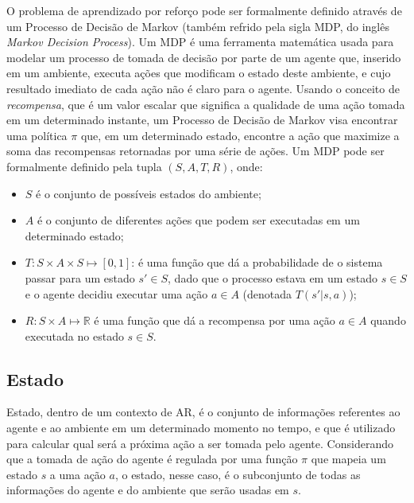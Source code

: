 \documentclass[cic,tc]{iiufrgs}
\begin{document}
O problema de aprendizado por reforço pode ser formalmente definido através
de um Processo de Decisão de Markov (também refrido pela sigla MDP, do inglês
\textit{Markov Decision Process}). Um MDP é uma ferramenta matemática usada
para modelar um processo de tomada de decisão por parte de um agente que,
inserido em um ambiente, executa ações que modificam o estado deste ambiente,
e cujo resultado imediato de cada ação não é claro para o agente. Usando o
conceito de \textit{recompensa}, que é um valor escalar que significa a
qualidade de uma ação tomada em um determinado instante, um Processo de Decisão
de Markov visa encontrar uma política $\pi$ que, em um determinado estado,
encontre a ação que maximize a soma das recompensas retornadas por uma série de
ações.
Um MDP pode ser formalmente definido pela tupla $ (S, A, T, R)$, onde:

\begin{itemize}
  \item $S$ é o conjunto de possíveis estados do ambiente;
  \item $A$ é o conjunto de diferentes ações que podem ser executadas em um
  determinado estado;
  \item $T: S \times A \times S \mapsto [0,1]$: é uma função que dá a
  probabilidade de o sistema passar para um estado $s' \in S$, dado que o
  processo estava em um estado $s \in S$ e o agente decidiu executar uma ação
  $a \in A$ (denotada $T(s'|s,a)$);
  \item $R: S \times A \mapsto \mathbb{R}$ é uma função que dá a recompensa
  por uma ação $a \in A$ quando executada no estado $s \in S$.
\end{itemize}


\subsection{Estado}
Estado, dentro de um contexto de AR, é o conjunto de informações referentes ao agente e ao ambiente em um determinado momento no tempo, e que é utilizado para calcular
qual será a próxima ação a ser tomada pelo agente. Considerando que a tomada de ação do agente é regulada por uma função $\pi$ que mapeia um estado
$s$ a uma ação $a$, o estado, nesse caso, é o subconjunto de todas as informações do agente e do ambiente que serão usadas em $s$.
\end{document}
